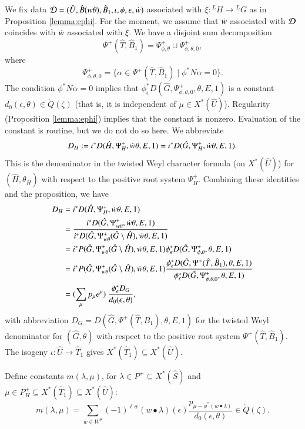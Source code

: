 We fix data $\mathcal D=(\hat U,\hat B(w\theta),\hat
B_1,\iota,\phi,\epsilon,\dot w)$ associated with $\xi:{}^LH\to{}^LG$ as
in Proposition \ref{lemma:ephi}.  For the moment, we assume that
$\dot w$ associated with $\mathcal D$ coincides with $\dot w$ associated with
$\xi$.  We have a disjoint sum decomposition
\[
\Psi^+(\hat T,\hat B_1) = \Psi_{\phi,\theta}^+\sqcup \Psi_{\phi,\theta,0}^+,
\]
where 
\[
\Psi_{\phi,\theta,0}^+ = 
\{\alpha\in \Psi^+(\hat T,\hat B_1)\mid \phi^* N\alpha=0\}.
\]
The condition $\phi^* N\alpha=0$ implies that $\phi^*_\epsilon D(\hat
G,\Psi_{\phi,\theta,0}^+,\theta,E,1)$ is a constant
$d_0(\epsilon,\theta)\in\ring{Q}(\zeta)$ (that is, it is independent
of $\mu\in X^*(\hat U)$).  Regularity (Proposition \ref{lemma:ephi})
implies that the constant is nonzero.  Evaluation of the constant is
routine, but we do not do so here.  We abbreviate
\begin{align*}
D_H := \iota^* D(\hat H,\Psi^+_H,\dot w\theta,E,1) 
= \iota^* D(\hat G,\Psi^+_H,\dot w\theta,E,1).
\end{align*}
This is the denominator in the twisted Weyl character formula (on
$X^*(\hat U)$) for $(\hat H,\theta_H)$ with respect to the positive
root system $\Psi^+_H$.  Combining these identities and the
proposition, we have
\begin{align}\label{eqn:DHDG}
\begin{split}
D_H &= i^* D(\hat H,\Psi^+_H,\dot w\theta,E,1)\\
&=\frac{i^*D(\hat G,\Psi_{w\theta}^+,\dot w\theta,E,1)}
{i^*D(\hat G,\Psi_{w\theta}^+(\hat G\setminus\hat H),\dot w\theta,E,1)}\\
&=
{i^*P(\hat G,\Psi_{w\theta}^+(\hat G\setminus\hat H),\dot w\theta,E,1)}
\phi^*_\epsilon D(\hat G,\Psi_{\phi,\theta}^+,\theta,E,1)\\
&=
{i^*P(\hat G,\Psi_{w\theta}^+(\hat G\setminus\hat H),\dot w\theta,E,1)}
\frac{\phi^*_\epsilon D(\hat G,\Psi^+(\hat T,\hat B_1),\theta,E,1)}
{\phi^*_\epsilon D(\hat G,\Psi_{\phi,\theta,0}^+,\theta,E,1)}\\
&=
(\sum_{\mu} p_\mu e^\mu) 
\ \frac{\phi^*_\epsilon D_G}{
d_0(\epsilon,\theta)},
\end{split}
\end{align}
with abbreviation $D_G= D(\hat G,\Psi^+(\hat T,\hat B_1),\theta,E,1)$
for the twisted Weyl denominator for $(\hat G,\theta)$ with respect to
the positive root system $\Psi^+(\hat T,\hat B_1)$.  The isogeny
$\iota:\hat U\to\hat T_1$ gives $X^*(\hat T_1)\subseteq X^*(\hat U)$.

Define constants $m(\lambda,\mu)$, for $\lambda\in P^+\subseteq
X^*(\hat S)$ and $\mu\in P_H^+ \subseteq X^*(\hat T_1)\subseteq
X^*(\hat U)$:
\begin{equation}\label{eqn:branch}
m(\lambda,\mu) = \sum_{w\in W^\theta} 
(-1)^{\ell w} ({w\bullet\lambda})(\epsilon)
\frac{p_{\mu-\phi^*(w\bullet\lambda)}}{d_0(\epsilon,\theta)} \in \ring{Q}(\zeta).
\end{equation}

